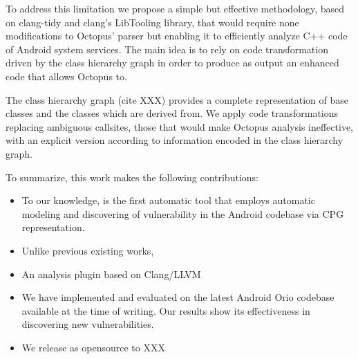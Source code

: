 To address this limitation we propose a simple but effective methodology, based on clang-tidy and clang's LibTooling library, that would require none modifications to Octopus' parser but enabling it to efficiently analyze C++ code of Android system services. The main idea is to rely on code transformation driven by the class hierarchy graph in order to produce as output an enhanced code that allows Octopus to.  

The class hierarchy graph (cite XXX) provides a complete representation of base classes and the classes which are derived from. We apply code transformations replacing ambiguous callsites, those that would make Octopus analysis ineffective, with an explicit version according to information encoded in the class hierarchy graph.

To summarize, this work makes the following contributions:

\begin{itemize}
\item To our knowledge, \octo is the first automatic tool that employs automatic modeling and discovering of vulnerability in the Android codebase via CPG representation. 
\item Unlike previous existing works, \octo 
\item An analysis plugin based on Clang/LLVM
\item We have implemented and evaluated \octo on the latest Android Orio codebase available at the time of writing. Our results show its effectiveness in discovering new vulnerabilities.
\item We release \octo as opensource to XXX
\end{itemize}


